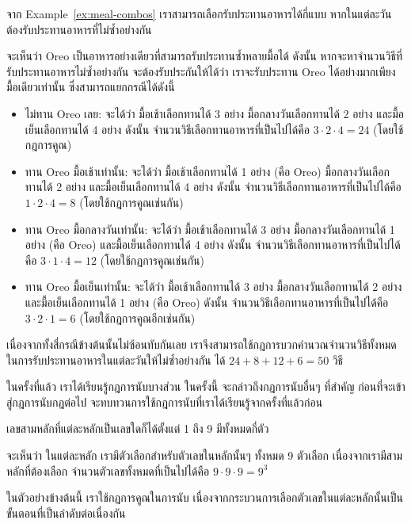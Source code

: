 \begin{example}
จาก Example~\ref{ex:meal-combos} เราสามารถเลือกรับประทานอาหารได้กี่แบบ หากในแต่ละวัน ต้องรับประทานอาหารที่ไม่ซ้ำอย่างกัน

จะเห็นว่า Oreo เป็นอาหารอย่างเดียวที่สามารถรับประทานซ้ำหลายมื้อได้ ดังนั้น หากจะหาจำนวนวิธีที่รับประทานอาหารไม่ซ้ำอย่างกัน จะต้องรับประกันให้ได้ว่า เราจะรับประทาน Oreo ได้อย่างมากเพียงมื้อเดียวเท่านั้น ซึ่งสามารถแยกกรณีได้ดังนี้
\begin{itemize}[]
\item ไม่ทาน Oreo เลย: จะได้ว่า มื้อเช้าเลือกทานได้ 3 อย่าง มื้อกลางวันเลือกทานได้ 2 อย่าง และมื้อเย็นเลือกทานได้ 4 อย่าง \enskip ดังนั้น จำนวนวิธีเลือกทานอาหารที่เป็นไปได้คือ $3\cdot 2\cdot 4=24$ (โดยใช้กฎการคูณ)
\item ทาน Oreo มื้อเช้าเท่านั้น: จะได้ว่า มื้อเช้าเลือกทานได้ 1 อย่าง (คือ Oreo) มื้อกลางวันเลือกทานได้ 2 อย่าง และมื้อเย็นเลือกทานได้ 4 อย่าง \enskip ดังนั้น จำนวนวิธีเลือกทานอาหารที่เป็นไปได้คือ $1\cdot 2\cdot 4=8$ (โดยใช้กฎการคูณเช่นกัน)
\item ทาน Oreo มื้อกลางวันเท่านั้น: จะได้ว่า มื้อเช้าเลือกทานได้ 3 อย่าง มื้อกลางวันเลือกทานได้ 1 อย่าง (คือ Oreo) และมื้อเย็นเลือกทานได้ 4 อย่าง \enskip ดังนั้น จำนวนวิธีเลือกทานอาหารที่เป็นไปได้คือ $3\cdot 1\cdot 4=12$ (โดยใช้กฎการคูณเช่นกัน)
\item ทาน Oreo มื้อเย็นเท่านั้น: จะได้ว่า มื้อเช้าเลือกทานได้ 3 อย่าง มื้อกลางวันเลือกทานได้ 2 อย่าง และมื้อเย็นเลือกทานได้ 1 อย่าง (คือ Oreo) \enskip ดังนั้น จำนวนวิธีเลือกทานอาหารที่เป็นไปได้คือ $3\cdot 2\cdot 1=6$ (โดยใช้กฎการคูณอีกเช่นกัน)
\end{itemize}
เนื่องจากทั้งสี่กรณีข้างต้นนั้นไม่ซ้อนทับกันเลย เราจึงสามารถใช้กฎการบวกคำนวณจำนวนวิธีทั้งหมดในการรับประทานอาหารในแต่ละวันให้ไม่ซ้ำอย่างกัน ได้ $24+8+12+6=50$ วิธี
\end{example}

ในครั้งที่แล้ว เราได้เรียนรู้กฎการนับบางส่วน \enskip ในครั้งนี้ จะกล่าวถึงกฎการนับอื่นๆ ที่สำคัญ \enskip ก่อนที่จะเข้าสู่กฎการนับกฎต่อไป จะทบทวนการใช้กฎการนับที่เราได้เรียนรู้จากครั้งที่แล้วก่อน
%
\begin{example}
เลขสามหลักที่แต่ละหลักเป็นเลขใดก็ได้ตั้งแต่ 1 ถึง 9 มีทั้งหมดกี่ตัว

จะเห็นว่า ในแต่ละหลัก เรามีตัวเลือกสำหรับตัวเลขในหลักนั้นๆ ทั้งหมด 9 ตัวเลือก \enskip เนื่องจากเรามีสามหลักที่ต้องเลือก จำนวนตัวเลขทั้งหมดที่เป็นไปได้คือ $9\cdot 9\cdot 9=9^3$

ในตัวอย่างข้างต้นนี้ เราใช้กฎการคูณในการนับ เนื่องจากกระบวนการเลือกตัวเลขในแต่ละหลักนั้นเป็นขั้นตอนที่เป็นลำดับต่อเนื่องกัน
\end{example}

